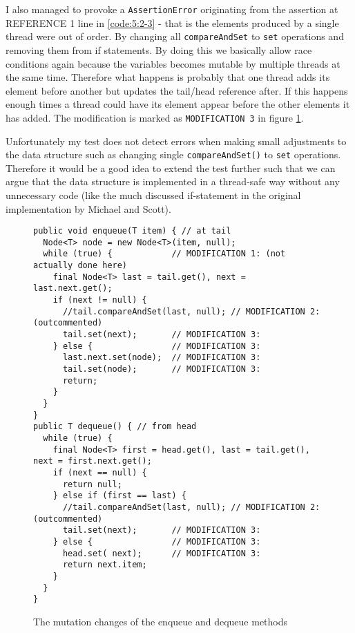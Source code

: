 \newpar I also managed to provoke a \texttt{AssertionError} originating from the assertion at REFERENCE 1 line in \ref{code:5:2-3} - that is the elements produced by a single thread were out of order. By changing all \texttt{compareAndSet} to \texttt{set} operations and removing them from if statements. By doing this we basically allow race conditions again because the variables becomes mutable by multiple threads at the same time. Therefore what happens is probably that one thread adds its element before another but updates the tail/head reference after. If this happens enough times a thread could have its element appear before the other elements it has added. The modification is marked as \texttt{MODIFICATION 3} in figure \ref{code:5:3}.

\newpar Unfortunately my test does not detect errors when making small adjustments to the data structure such as changing single \texttt{compareAndSet()} to \texttt{set} operations. Therefore it would be a good idea to extend the test further such that we can argue that the data structure is implemented in a thread-safe way without any unnecessary code (like the much discussed if-statement in the original implementation by Michael and Scott).

\begin{figure}
\begin{lstlisting}
public void enqueue(T item) { // at tail
  Node<T> node = new Node<T>(item, null);
  while (true) {            // MODIFICATION 1: (not actually done here)
    final Node<T> last = tail.get(), next = last.next.get();
    if (next != null) {
      //tail.compareAndSet(last, null); // MODIFICATION 2: (outcommented)
      tail.set(next);       // MODIFICATION 3:
    } else {                // MODIFICATION 3:
      last.next.set(node);  // MODIFICATION 3:
      tail.set(node);       // MODIFICATION 3:
      return;
    }
  }
}
public T dequeue() { // from head
  while (true) {
    final Node<T> first = head.get(), last = tail.get(), next = first.next.get();
    if (next == null) {
      return null;
    } else if (first == last) {
      //tail.compareAndSet(last, null); // MODIFICATION 2: (outcommented)
      tail.set(next);       // MODIFICATION 3:
    } else {                // MODIFICATION 3:
      head.set( next);      // MODIFICATION 3:
      return next.item;
    }
  }
}
\end{lstlisting}
\caption{The mutation changes of the enqueue and dequeue methods}
\label{code:5:3}
\end{figure}